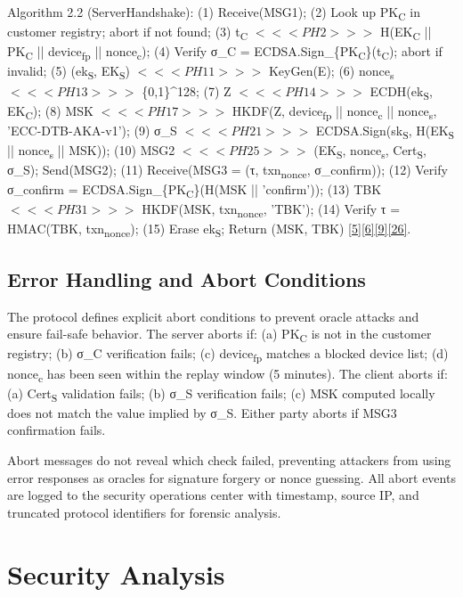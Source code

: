 \indent Algorithm 2.2 (ServerHandshake): (1) Receive(MSG1); (2) Look up PK\textsubscript{C} in customer registry; abort if not found; (3) t\textsubscript{C} $<<<PH2>>>$ H(EK\textsubscript{C} || PK\textsubscript{C} || device\textsubscript{fp} || nonce\textsubscript{c}); (4) Verify σ\_C = ECDSA.Sign\_\{PK\textsubscript{C}\}(t\textsubscript{C}); abort if invalid; (5) (ek\textsubscript{S}, EK\textsubscript{S}) $<<<PH11>>>$ KeyGen(E); (6) nonce\textsubscript{s} $<<<PH13>>>$ \{0,1\}\textasciicircum{}128; (7) Z $<<<PH14>>>$ ECDH(ek\textsubscript{S}, EK\textsubscript{C}); (8) MSK $<<<PH17>>>$ HKDF(Z, device\textsubscript{fp} || nonce\textsubscript{c} || nonce\textsubscript{s}, 'ECC-DTB-AKA-v1'); (9) σ\_S $<<<PH21>>>$ ECDSA.Sign(sk\textsubscript{S}, H(EK\textsubscript{S} || nonce\textsubscript{s} || MSK)); (10) MSG2 $<<<PH25>>>$ (EK\textsubscript{S}, nonce\textsubscript{s}, Cert\textsubscript{S}, σ\_S); Send(MSG2); (11) Receive(MSG3 = (τ, txn\textsubscript{nonce}, σ\_confirm)); (12) Verify σ\_confirm = ECDSA.Sign\_\{PK\textsubscript{C}\}(H(MSK || 'confirm')); (13) TBK $<<<PH31>>>$ HKDF(MSK, txn\textsubscript{nonce}, 'TBK'); (14) Verify τ = HMAC(TBK, txn\textsubscript{nonce}); (15) Erase ek\textsubscript{S}; Return (MSK, TBK) \hyperref[ref:5]{[5]}\hyperref[ref:6]{[6]}\hyperref[ref:9]{[9]}\hyperref[ref:26]{[26]}.

\subsection{Error Handling and Abort Conditions}

\indent The protocol defines explicit abort conditions to prevent oracle attacks and ensure fail-safe behavior. The server aborts if: (a) PK\textsubscript{C} is not in the customer registry; (b) σ\_C verification fails; (c) device\textsubscript{fp} matches a blocked device list; (d) nonce\textsubscript{c} has been seen within the replay window (5 minutes). The client aborts if: (a) Cert\textsubscript{S} validation fails; (b) σ\_S verification fails; (c) MSK computed locally does not match the value implied by σ\_S. Either party aborts if MSG3 confirmation fails.

\indent Abort messages do not reveal which check failed, preventing attackers from using error responses as oracles for signature forgery or nonce guessing. All abort events are logged to the security operations center with timestamp, source IP, and truncated protocol identifiers for forensic analysis.

\section{Security Analysis}

